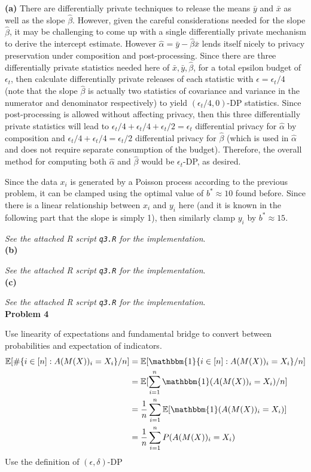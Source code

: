 \documentclass[12pt]{article}
\begin{document}
\textbf{(a)} There are differentially private techniques to release the means $\bar{y}$ and $\bar{x}$ as well as the slope $\hat{\beta}$. However, given the careful considerations needed for the slope $\hat{\beta}$, it may be challenging to come up with a single differentially private mechanism to derive the intercept estimate. However $\hat{\alpha} = \bar{y} - \hat{\beta}\bar{x}$ lends itself nicely to privacy preservation under composition and post-processing. Since there are three differentially private statistics needed here of $\bar{x}, \bar{y}, \hat{\beta}$, for a total epsilon budget of $\epsilon_t$, then calculate differentially private releases of each statistic with $\epsilon = \epsilon_t/4$ (note that the slope $\hat{\beta}$ is actually two statistics of covariance and variance in the numerator and denominator respectively) to yield $(\epsilon_t / 4,0)$-DP statistics. Since post-processing is allowed without affecting privacy, then this three differentially private statistics will lead to $\epsilon_t / 4 + \epsilon_t / 4 + \epsilon_t / 2 = \epsilon_t$ differential privacy for $\hat{\alpha}$ by composition and $\epsilon_t/4 + \epsilon_t/4 = \epsilon_t/2$ differential privacy for $\hat{\beta}$ (which is used in $\hat{\alpha}$ and does not require separate consumption of the budget). Therefore, the overall method for computing both $\hat{\alpha}$ and $\hat{\beta}$ would be $\epsilon_t$-DP, as desired.

Since the data $x_i$ is generated by a Poisson process according to the previous problem, it can be clamped using the optimal value of $b^*\approx 10$ found before. Since there is a linear relationship between $x_i$ and $y_i$ here (and it is known in the following part that the slope is simply 1), then similarly clamp $y_i$ by $b^* \approx 15$.

\emph{See the attached R script \texttt{q3.R} for the implementation}.\\

\textbf{(b)} 

\emph{See the attached R script \texttt{q3.R} for the implementation}.\\

\textbf{(c)} 

\emph{See the attached R script \texttt{q3.R} for the implementation}.\\

{\large\textbf{Problem 4}}

Use linearity of expectations and fundamental bridge to convert between probabilities and expectation of indicators.
\begin{align*}
	\mathbb{E}[\#\{ i\in [n]: A(M(X))_i = X_i\} / n] &= \mathbb{E}[\mathbbm{1}\{ i\in [n]: A(M(X))_i = X_i\} / n]\\
	&= \mathbb{E}[\sum\limits^n_{i=1}\mathbbm{1}(A(M(X))_i = X_i) / n]\\
	&= \dfrac{1}{n}\sum\limits^n_{i=1}\mathbb{E}[\mathbbm{1}(A(M(X))_i = X_i)]\\
	&= \dfrac{1}{n}\sum\limits^n_{i=1}P(A(M(X))_i = X_i)
\end{align*}
Use the definition of $(\epsilon, \delta)$-DP
\end{document}

